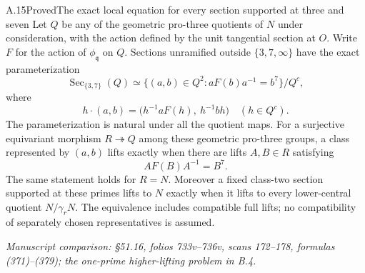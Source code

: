\begin{statement}{A.15}{Proved}{The exact local equation for every section supported at three and seven}
Let $Q$ be any of the geometric pro-three quotients of $N$
under consideration, with the action defined by the unit
tangential section at $O$. Write $F$ for the action of
$\phi_{\mathfrak q}$ on $Q$. Sections unramified outside
$\{3,7,\infty\}$ have the exact parameterization
\[
 \operatorname{Sec}_{\{3,7\}}(Q)\simeq
 \{(a,b)\in Q^2:aF(b)a^{-1}=b^7\}/Q^c,
 \tag{A.15.1}
\]
where
\[
 h\cdot(a,b)=\bigl(h^{-1}aF(h),\ h^{-1}bh\bigr)
       \quad(h\in Q^c).
 \tag{A.15.2}
\]
The parameterization is natural under all the quotient maps.
For a surjective equivariant morphism $R\twoheadrightarrow Q$
among these geometric pro-three groups, a class represented by
$(a,b)$ lifts exactly when there are lifts $A,B\in R$ satisfying
\[
 A F(B)A^{-1}=B^7.
 \tag{A.15.3}
\]
The same statement holds for $R=N$. Moreover a fixed class-two
section supported at these primes lifts to $N$ exactly when
it lifts to every lower-central quotient $N/\gamma_rN$.
The equivalence includes compatible full lifts; no compatibility
of separately chosen representatives is assumed.
\par\smallskip\noindent\emph{Manuscript comparison: \S51.16,
folios 733v--736v, scans 172--178, formulas (371)--(379); the
one-prime higher-lifting problem in B.4.}
\end{statement}
